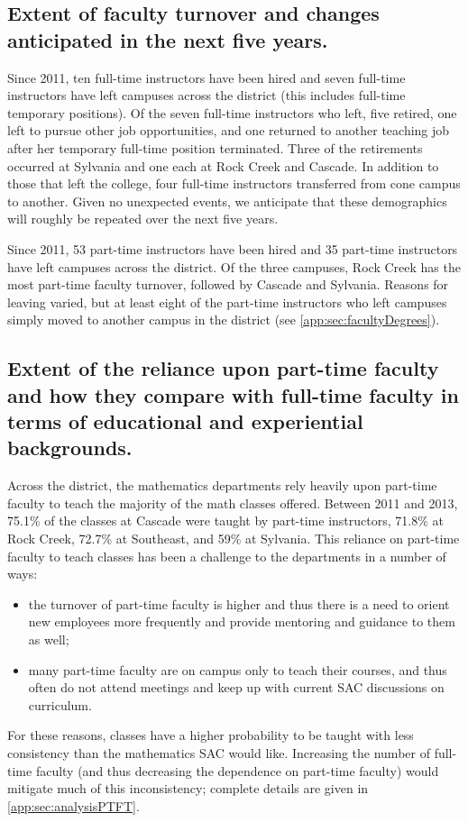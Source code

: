 \subsection[Faculty turnover]{Extent of faculty turnover and changes anticipated in the next five
years.} 
Since 2011, ten full-time instructors have been hired and seven full-time
instructors have left campuses across the district (this includes full-time 
temporary positions).  Of the seven full-time
instructors who left, five retired, one left to pursue other job opportunities,
and one returned to another teaching job after her temporary full-time position terminated.  Three of the retirements occurred at Sylvania and one each at Rock
Creek and Cascade.  In addition to those that left the college, four full-time instructors transferred from cone campus to another.   Given no unexpected events, we anticipate that these demographics will roughly be repeated over the next five years.


Since 2011, 53 part-time instructors have been hired and 35 part-time
instructors have left campuses across the district.  Of the three campuses,
Rock Creek has the most part-time faculty turnover, followed by Cascade and
Sylvania.  Reasons for leaving varied, but at least eight of the part-time
instructors who left campuses simply moved to another campus in the district
(see \vref{app:sec:facultyDegrees}).

\subsection[Part-time faculty]{Extent of the reliance upon part-time faculty and how they compare
with full-time faculty in terms of educational and experiential backgrounds.}
Across the district, the mathematics departments rely heavily upon part-time
faculty to teach the majority of the math classes offered.  Between 2011 and
2013, 75.1\% of the classes at Cascade were taught by part-time instructors,
71.8\% at Rock Creek, 72.7\% at Southeast, and 59\% at Sylvania.  This reliance
on part-time faculty to teach classes has been a challenge to the departments
in a number of ways:  
\begin{itemize}
\item the turnover of part-time faculty is higher and
thus there is a need to orient new employees more frequently and provide
mentoring and guidance to them as well;
\item many part-time faculty are on
campus only to teach their courses, and thus often do not attend meetings and
keep up with current SAC discussions on curriculum.  
\end{itemize}
For these reasons, classes have a higher probability to be taught with less consistency than the
mathematics SAC would like.  Increasing the number of full-time faculty (and
thus decreasing the dependence on part-time faculty) would mitigate much of
this inconsistency; complete details are given in  \vref{app:sec:analysisPTFT}.

